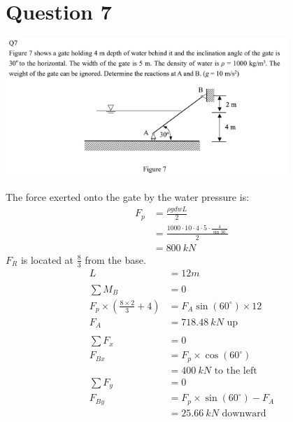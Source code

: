 \documentclass{article}
\begin{document}
\section*{Question 7}
\begin{center}
    \includegraphics[width=0.8\textwidth]{img/2-3.jpg}
\end{center}
The force exerted onto the gate by the water pressure is:
\begin{align*}
    F_p & =\frac{\rho g d w L}{2}                                        \\
        & = \frac{1000\cdot10\cdot4\cdot5\cdot\frac{4}{\sin30^\circ}}{2} \\
        & = 800\ kN
\end{align*}
$F_R$ is located at $\frac{8}{3}$ from the base.
\begin{align*}
    L                               & = 12m                               \\
    \\
    \sum M_B                        & = 0                                 \\
    F_p\times(\frac{8\times2}{3}+4) & = F_{A}\sin(60^\circ)\times12       \\
    F_{A}                           & =718.48\ kN\text{ up}               \\
    \\
    \sum F_{x}                      & =0                                  \\
    F_{Bx}                          & = F_p \times \cos(60^\circ)         \\
                                    & = 400\ kN\text{ to the left}        \\
    \sum F_{y}                      & = 0                                 \\
    F_{By}                          & = F_p \times \sin(60^\circ) - F_{A} \\
                                    & = 25.66\ kN\text{ downward}         \\
\end{align*}
\end{document}
